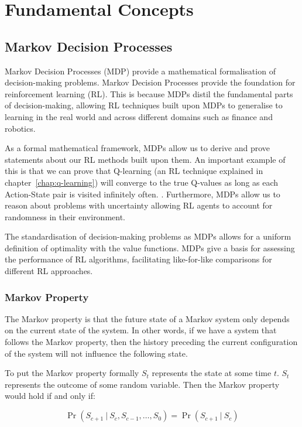\documentclass[]{final_report}
\begin{document}
\chapter{Fundamental Concepts}
\section{Markov Decision Processes}

Markov Decision Processes (MDP) provide a mathematical formalisation of decision-making problems. Markov Decision Processes provide the foundation for reinforcement learning (RL). This is because MDPs distil the fundamental parts of decision-making, allowing RL techniques built upon MDPs to generalise to learning in the real world and across different domains such as finance and robotics. 

As a formal mathematical framework, MDPs allow us to derive and prove statements about our RL methods built upon them. An important example of this is that we can prove that Q-learning (an RL technique explained in chapter~\ref{chap:q-learning}) will converge to the true Q-values as long as each Action-State pair is visited infinitely often. \cite{watkins1992q}. Furthermore, MDPs allow us to reason about problems with uncertainty allowing RL agents to account for randomness in their environment. 

The standardisation of decision-making problems as MDPs allows for a uniform definition of optimality with the value functions. MDPs give a basis for assessing the performance of RL algorithms, facilitating like-for-like comparisons for different RL approaches. 


\subsection{Markov Property}

The Markov property is that the future state of a Markov system only depends on the current state of the system. In other words, if we have a system that follows the Markov property, then the history preceding the current configuration of the system will not influence the following state.

To put the Markov property formally $S_t$ represents the state at some time $t$. $S_t$ represents the outcome of some random variable. Then the Markov property would hold if and only if:


\begin{equation}
  \Pr(S_{c+1}\ |\ S_{c},S_{c-1},\dots,S_0) = \Pr(S_{c+1}\ |\ S_{c})
  \label{eqn:markov-property}
\end{equation}
\end{document}
